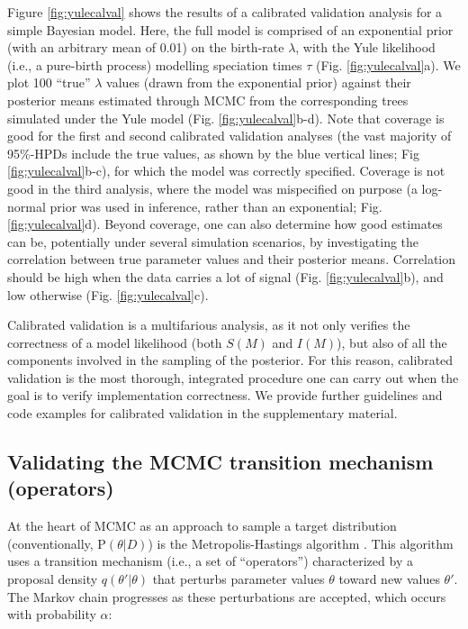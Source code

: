 \documentclass[oneside]{article}
\begin{document}
Figure \ref{fig:yulecalval} shows the results of a calibrated
validation analysis for a simple Bayesian model.
Here, the full model is comprised of an exponential prior (with an
arbitrary mean of 0.01) on the birth-rate
$\lambda$, with the Yule likelihood (i.e., a pure-birth process)
modelling speciation times $\tau$ (Fig. \ref{fig:yulecalval}a).
We plot 100 ``true'' $\lambda$ values (drawn from the exponential prior)
against their posterior means estimated through MCMC from the
corresponding trees simulated under the Yule model
(Fig. \ref{fig:yulecalval}b-d).
Note that coverage is good for the first and second calibrated
validation analyses (the vast majority of 95\%-HPDs
include the true values, as shown by the blue vertical lines; Fig
\ref{fig:yulecalval}b-c), for which the model was correctly
specified.
Coverage is not good in the third analysis, where the model was
mispecified on purpose (a log-normal prior was used in inference,
rather than an exponential; Fig. \ref{fig:yulecalval}d).
Beyond coverage, one can also determine how good estimates can be,
potentially under several simulation scenarios, by investigating the
correlation between true parameter values and their posterior means.
Correlation should be high when the data carries a lot of
signal (Fig. \ref{fig:yulecalval}b), and low otherwise (Fig. \ref{fig:yulecalval}c).

Calibrated validation is a multifarious
analysis, as it not only verifies the correctness of a model
likelihood (both $S(M)$ and $I(M)$), but also of all the components
involved in the sampling of the posterior.
For this reason, calibrated validation is the most thorough,
integrated procedure one can carry out when the goal is to verify
implementation correctness.
We provide further guidelines and code examples for
calibrated validation in the supplementary material.

\subsection*{Validating the MCMC transition mechanism (operators)}

At the heart of MCMC as an approach to sample a target distribution
(conventionally, $\text{P}(\theta|D)$) is
the Metropolis-Hastings algorithm \citep{mh}.
This algorithm uses a transition mechanism (i.e., a set of
``operators'') characterized by a proposal density $q(\theta'|\theta)$
that perturbs parameter values $\theta$ toward new values $\theta'$.
The Markov chain progresses as these perturbations are accepted, which
occurs with probability $\alpha$:
\end{document}
